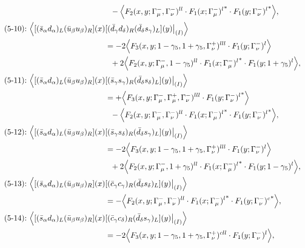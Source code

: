 \begin{align}
\notag\\*&\ \ 
 - \Big\langle F_2(x,y;\Gamma_\mu^-,\Gamma_\nu^-)^{ll} \cdot {F_1(x;\Gamma_\mu^-)^l}^* \cdot {F_1(y;\Gamma_\nu^-)^l}^*\Big\rangle,
\\
\mbox{(5-10):}\ 
\Big\langle
[(\bar s_\alpha d_\alpha)_L(\bar u_\beta u_\beta)_R](x)&
[(\bar d_\gamma d_\delta)_R(\bar d_\delta s_\gamma)_L](y)\big|_{(I)}
\Big\rangle
\notag\\*
&=
-2\Big\langle F_3(x,y;1-\gamma_5,1+\gamma_5,\Gamma_\nu^+)^{lll} \cdot F_1(y;\Gamma_\nu^-)^l\Big\rangle
\notag\\*&\ \ 
 + 2\Big\langle F_2(x,y;\Gamma_\mu^-,1-\gamma_5)^{ll} \cdot {F_1(x;\Gamma_\mu^-)^l}^* \cdot F_1(y;1+\gamma_5)^l\Big\rangle,
\\
\mbox{(5-11):}\ 
\Big\langle
[(\bar s_\alpha d_\alpha)_L(\bar u_\beta u_\beta)_R](x)&
[(\bar s_\gamma s_\gamma)_R(\bar d_\delta s_\delta)_L](y)\big|_{(I)}
\Big\rangle
\notag\\*
&=
 + \Big\langle F_3(x,y;\Gamma_\mu^-,\Gamma_\mu^+,\Gamma_\nu^-)^{lll} \cdot {F_1(y;\Gamma_\nu^-)^l}^*\Big\rangle
\notag\\*&\ \ 
 - \Big\langle F_2(x,y;\Gamma_\mu^-,\Gamma_\nu^-)^{ll} \cdot {F_1(x;\Gamma_\mu^-)^l}^* \cdot {F_1(y;\Gamma_\nu^-)^l}^*\Big\rangle,
\\
\mbox{(5-12):}\ 
\Big\langle
[(\bar s_\alpha d_\alpha)_L(\bar u_\beta u_\beta)_R](x)&
[(\bar s_\gamma s_\delta)_R(\bar d_\delta s_\gamma)_L](y)\big|_{(I)}
\Big\rangle
\notag\\*
&=
-2\Big\langle F_3(x,y;1-\gamma_5,1+\gamma_5,\Gamma_\nu^+)^{lll} \cdot F_1(y;\Gamma_\nu^-)^l\Big\rangle
\notag\\*&\ \ 
 + 2\Big\langle F_2(x,y;\Gamma_\mu^-,1+\gamma_5)^{ll} \cdot {F_1(x;\Gamma_\mu^-)^l}^* \cdot F_1(y;1-\gamma_5)^l\Big\rangle,
\\
\mbox{(5-13):}\ 
\Big\langle
[(\bar s_\alpha d_\alpha)_L(\bar u_\beta u_\beta)_R](x)&
[(\bar c_\gamma c_\gamma)_R(\bar d_\delta s_\delta)_L](y)\big|_{(I)}
\Big\rangle
\notag\\*
&=
 - \Big\langle F_2(x,y;\Gamma_\mu^-,\Gamma_\nu^-)^{ll} \cdot {F_1(x;\Gamma_\mu^-)^l}^* \cdot {F_1(y;\Gamma_\nu^-)^c}^*\Big\rangle,
\\
\mbox{(5-14):}\ 
\Big\langle
[(\bar s_\alpha d_\alpha)_L(\bar u_\beta u_\beta)_R](x)&
[(\bar c_\gamma c_\delta)_R(\bar d_\delta s_\gamma)_L](y)\big|_{(I)}
\Big\rangle
\notag\\*
&=
-2\Big\langle F_3(x,y;1-\gamma_5,1+\gamma_5,\Gamma_\nu^+)^{cll} \cdot F_1(y;\Gamma_\nu^-)^l\Big\rangle,
\\

\end{align}
